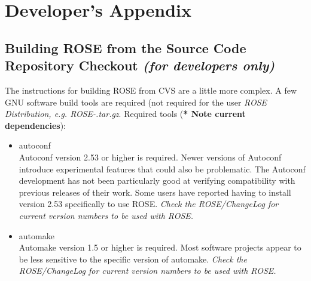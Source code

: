\chapter{ Developer's Appendix }

\label{developersAppendix:developersAppendix}

\section{Building ROSE from the Source Code Repository Checkout {\em (for developers only)}}
\label{gettingStarted:DeveloperInstructions}

     The instructions for building ROSE from CVS are a little more complex.
A few GNU software build tools are required (not required for the user
{\em ROSE Distribution, e.g. ROSE-\VersionNumber.tar.gz}.  Required tools ({\bf ** Note current dependencies}):
\begin{itemize}
     \item autoconf \\
          Autoconf version 2.53 or higher is required. %
          Newer versions of Autoconf introduce experimental features that could also be problematic.  The
          Autoconf development has not been particularly good at verifying compatibility
          with previous releases of their work.  Some users have reported having to
          install version 2.53 specifically to use ROSE. 
          {\em Check the ROSE/ChangeLog for current version numbers to be used with ROSE.}
     \item automake \\
          Automake version 1.5 or higher is required. Most software projects appear to be
          less sensitive to the specific version of automake.
          {\em Check the ROSE/ChangeLog for current version numbers to be used with ROSE.}
\end{itemize}


